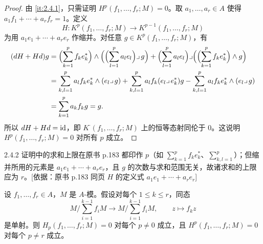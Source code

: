 \begin{proof}
由 \ref{it:2.4.1}，只需证明 $H^p(f_1,\dots,f_r;M)=0$。取 $a_1,\dots,a_r\in A$ 使得 $a_1f_1+\cdots+a_rf_r=1$。定义
\[
H\colon K^p(f_1,\dots,f_r;M)\to K^{p-1}(f_1,\dots,f_r;M)
\]
为用 $a_1e_1+\cdots+a_re_r$ 作缩并。对任意 $g\in K^p(f_1,\dots,f_r;M)$，有
\[
\begin{aligned}
(dH+Hd)g
&=\Bigl(\sum_{k=1}^{p}f_ke_k^{*}\Bigr)\wedge\Bigl(\Bigl(\sum_{l=1}^{p}a_le_l\Bigr)\lrcorner\, g\Bigr)
+\Bigl(\sum_{l=1}^{p}a_le_l\Bigr)\lrcorner\Bigl(\Bigl(\sum_{k=1}^{p}f_ke_k^{*}\Bigr)\wedge g\Bigr)\\
&=\sum_{k,l=1}^{p}a_lf_ke_k^{*}\wedge(e_l\lrcorner\, g)+\sum_{k,l=1}^{p}a_lf_k(e_l\lrcorner\, e_k^{*})g
-\sum_{k,l=1}^{p}a_lf_ke_k^{*}\wedge(e_l\lrcorner\, g)\\
&=\sum_{k=1}^{p}a_kf_kg=g.
\end{aligned}
\]
所以 $dH+Hd=\operatorname{id}$，即 $K^{\cdot}(f_1,\dots,f_r;M)$ 上的恒等态射同伦于 $0$。这说明 $H^p(f_1,\dots,f_r;M)=0$ 对所有 $p$ 成立。
\end{proof}

\begin{tnote}
2.4.2 证明中的求和上限在原书 p.183 都印作 $p$（如 $\sum_{k=1}^{p}f_ke_k^{*}$、$\sum_{k,l=1}^{p}$）；但缩并所用的元素是 $a_1e_1+\cdots+a_re_r$，且 $g$ 的次数与求和范围无关，故诸求和的上限应为 $r$。[依据：原书 p.183 同页 $H$ 的定义式 $a_1e_1+\cdots+a_re_r$]
\end{tnote}

\begin{proposition}\label{it:2.4.3}
设 $f_1,\dots,f_r\in A$，$M$ 是 $A$-模。假设对每个 $1\le k\le r$，同态
\[
M\Big/\sum_{i=1}^{k-1}f_iM\to M\Big/\sum_{i=1}^{k-1}f_iM,\qquad z\mapsto f_kz
\]
是单射。则 $H_p(f_1,\dots,f_r;M)=0$ 对每个 $p\ne 0$ 成立，且 $H^p(f_1,\dots,f_r;M)=0$ 对每个 $p\ne r$ 成立。
\end{proposition}

